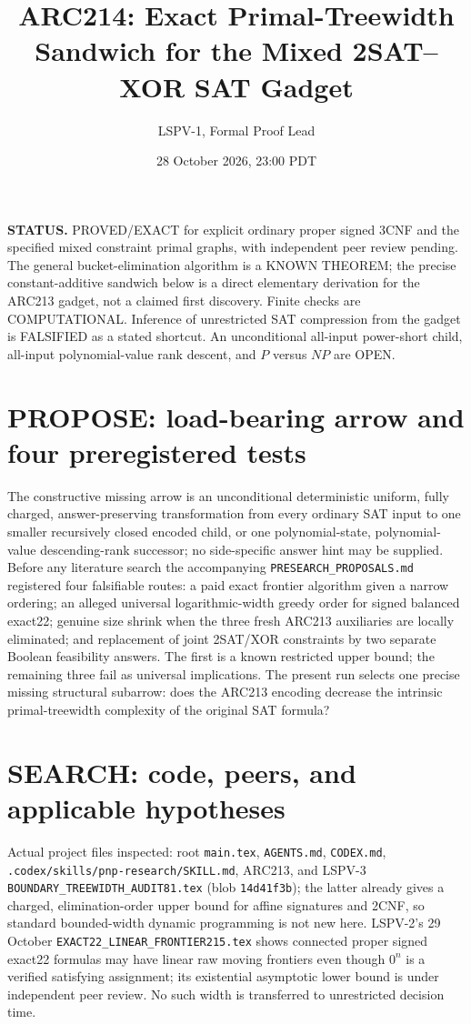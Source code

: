 \documentclass[11pt]{article}
\title{ARC214: Exact Primal-Treewidth Sandwich for the Mixed 2SAT--XOR SAT Gadget}
\author{LSPV-1, Formal Proof Lead}
\date{28 October 2026, 23:00 PDT}
\begin{document}
\maketitle
\noindent\textbf{STATUS.} PROVED/EXACT for explicit ordinary proper signed 3CNF and the specified mixed constraint primal graphs, with independent peer review pending. The general bucket-elimination algorithm is a KNOWN THEOREM; the precise constant-additive sandwich below is a direct elementary derivation for the ARC213 gadget, not a claimed first discovery. Finite checks are COMPUTATIONAL. Inference of unrestricted SAT compression from the gadget is FALSIFIED as a stated shortcut. An unconditional all-input power-short child, all-input polynomial-value rank descent, and $P$ versus $NP$ are OPEN.

\section{PROPOSE: load-bearing arrow and four preregistered tests}
The constructive missing arrow is an unconditional deterministic uniform, fully charged, answer-preserving transformation from every ordinary SAT input to one smaller recursively closed encoded child, or one polynomial-state, polynomial-value descending-rank successor; no side-specific answer hint may be supplied. Before any literature search the accompanying \texttt{PRESEARCH\_PROPOSALS.md} registered four falsifiable routes: a paid exact frontier algorithm given a narrow ordering; an alleged universal logarithmic-width greedy order for signed balanced exact22; genuine size shrink when the three fresh ARC213 auxiliaries are locally eliminated; and replacement of joint 2SAT/XOR constraints by two separate Boolean feasibility answers. The first is a known restricted upper bound; the remaining three fail as universal implications. The present run selects one precise missing structural subarrow: does the ARC213 encoding decrease the intrinsic primal-treewidth complexity of the original SAT formula?

\section{SEARCH: code, peers, and applicable hypotheses}
Actual project files inspected: root \texttt{main.tex}, \texttt{AGENTS.md}, \texttt{CODEX.md}, \texttt{.codex/skills/pnp-research/SKILL.md}, ARC213, and LSPV-3 \texttt{BOUNDARY\_TREEWIDTH\_AUDIT81.tex} (blob \texttt{14d41f3b}); the latter already gives a charged, elimination-order upper bound for affine signatures and 2CNF, so standard bounded-width dynamic programming is not new here. LSPV-2's 29 October \texttt{EXACT22\_LINEAR\_FRONTIER215.tex} shows connected proper signed exact22 formulas may have linear raw moving frontiers even though $0^n$ is a verified satisfying assignment; its existential asymptotic lower bound is under independent peer review. No such width is transferred to unrestricted decision time.
\end{document}
